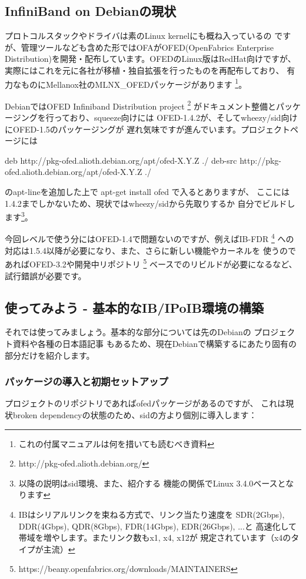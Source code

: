 \documentclass[mingoth,a4paper]{jsarticle}
\begin{document}
\subsection{InfiniBand on Debianの現状}
プロトコルスタックやドライバは素のLinux kernelにも概ね入っているの
ですが、管理ツールなども含めた形ではOFAがOFED(OpenFabrics Enterprise
Distribution)を開発・配布しています。OFEDのLinux版はRedHat向けですが、
実際にはこれを元に各社が移植・独自拡張を行ったものを再配布しており、
有力なものにMellanox社のMLNX\_OFEDパッケージがあります
\footnote{
これの付属マニュアル\cite{MLNXMAN}は何を措いても読むべき資料
}。

DebianではOFED Infiniband Distribution project
\footnote{http://pkg-ofed.alioth.debian.org/}
がドキュメント整備とパッケージングを行っており、squeeze向けには
OFED-1.4.2が、そしてwheezy/sid向けにOFED-1.5のパッケージングが
遅れ気味ですが進んでいます。プロジェクトページには
\begin{commandline}
deb     http://pkg-ofed.alioth.debian.org/apt/ofed-X.Y.Z ./
deb-src http://pkg-ofed.alioth.debian.org/apt/ofed-X.Y.Z ./
\end{commandline}
のapt-lineを追加した上で apt-get install ofed で入るとありますが、
ここには1.4.2までしかないため、現状ではwheezy/sidから先取りするか
自分でビルドします\footnote{以降の説明はsid環境、また、紹介する
機能の関係でLinux 3.4.0ベースとなります}。

今回レベルで使う分にはOFED-1.4で問題ないのですが、例えばIB-FDR
\footnote{IBはシリアルリンクを束ねる方式で、リンク当たり速度を
SDR(2Gbps), DDR(4Gbps), QDR(8Gbps), FDR(14Gbps), EDR(26Gbps), ...と
高速化して帯域を増やします。またリンク数もx1, x4, x12が
規定されています（x4のタイプが主流）}
への対応は1.5.4以降が必要になり、また、さらに新しい機能やカーネルを
使うのであればOFED-3.2や開発中リポジトリ
\footnote{https://beany.openfabrics.org/downloads/MAINTAINERS}
ベースでのリビルドが必要になるなど、試行錯誤が必要です。

\subsection{使ってみよう - 基本的なIB/IPoIB環境の構築}
それでは使ってみましょう。基本的な部分については先のDebianの
プロジェクト資料\cite{DEBIANIB}や各種の日本語記事\cite{ALTIMA}
\cite{ATMARK}もあるため、現在Debianで構築するにあたり固有の
部分だけを紹介します。

\subsubsection{パッケージの導入と初期セットアップ}
プロジェクトのリポジトリであればofedパッケージがあるのですが、
これは現状broken dependencyの状態のため、sidの方より個別に導入します：
\end{document}
